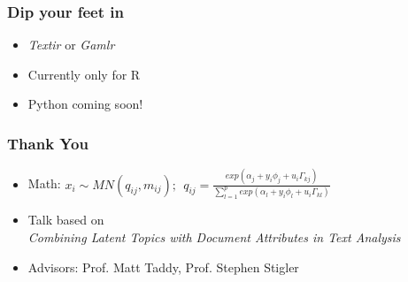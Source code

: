\documentclass[presentation]{beamer}
\begin{document}
\begin{frame}
\frametitle{Dip your feet in}
\pause
\begin{itemize}
\item \textit{Textir} or \textit{Gamlr} 
\item Currently only for R
\item Python coming soon!
\end{itemize}
\end{frame}

\begin{frame}
\frametitle{Thank You}
\begin{itemize}
\item Math: $ x_{i} \sim MN(q_{ij},m_{ij})    ; ~~  q_{ij} = \frac{exp(\alpha_j + y_i \phi_j + u_i \Gamma_{kj})}{\sum_{l=1}^{p}{exp(\alpha_l+ y_i \phi_l + u_i \Gamma_{kl})}} $
\item Talk based on \\ \textit{Combining Latent Topics with Document Attributes in Text Analysis}
\item Advisors: 
 Prof. Matt Taddy\footnotemark {},
Prof. Stephen Stigler\footnotemark {}
\end{itemize}
\end{frame}
\end{document}
